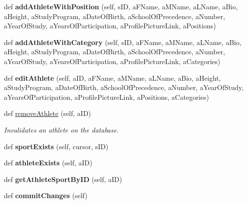 \begin{DoxyCompactItemize}
\mbox{\label{classhandler_1_1dao_1_1athlete__dao_1_1_athlete_d_a_o_a1fe64fa924a8b61d35696786f259c17f}} 
def {\bfseries add\+Athlete\+With\+Position} (self, s\+ID, a\+F\+Name, a\+M\+Name, a\+L\+Name, a\+Bio, a\+Height, a\+Study\+Program, a\+Date\+Of\+Birth, a\+School\+Of\+Precedence, a\+Number, a\+Year\+Of\+Study, a\+Years\+Of\+Participation, a\+Profile\+Picture\+Link, a\+Positions)
\item 
\mbox{\label{classhandler_1_1dao_1_1athlete__dao_1_1_athlete_d_a_o_a733537eff0206d83f15436b09704be45}} 
def {\bfseries add\+Athlete\+With\+Category} (self, s\+ID, a\+F\+Name, a\+M\+Name, a\+L\+Name, a\+Bio, a\+Height, a\+Study\+Program, a\+Date\+Of\+Birth, a\+School\+Of\+Precedence, a\+Number, a\+Year\+Of\+Study, a\+Years\+Of\+Participation, a\+Profile\+Picture\+Link, a\+Categories)
\item 
\mbox{\label{classhandler_1_1dao_1_1athlete__dao_1_1_athlete_d_a_o_a79d97bcfdc2ba5f68bfdf975f7c341b9}} 
def {\bfseries edit\+Athlete} (self, a\+ID, a\+F\+Name, a\+M\+Name, a\+L\+Name, a\+Bio, a\+Height, a\+Study\+Program, a\+Date\+Of\+Birth, a\+School\+Of\+Precedence, a\+Number, a\+Year\+Of\+Study, a\+Years\+Of\+Participation, a\+Profile\+Picture\+Link, a\+Positions, a\+Categories)
\item 
def \hyperlink{classhandler_1_1dao_1_1athlete__dao_1_1_athlete_d_a_o_a2677d09a6586e6742190c81270dc408a}{remove\+Athlete} (self, a\+ID)
\begin{DoxyCompactList}\small\item\em Invalidates an athlete on the database. \end{DoxyCompactList}\item 
\mbox{\label{classhandler_1_1dao_1_1athlete__dao_1_1_athlete_d_a_o_acf5929b8fe16451d4dad25146d93e426}} 
def {\bfseries sport\+Exists} (self, cursor, s\+ID)
\item 
\mbox{\label{classhandler_1_1dao_1_1athlete__dao_1_1_athlete_d_a_o_a03e4d89c4586e8afa2a379f9b3e99d0d}} 
def {\bfseries athlete\+Exists} (self, a\+ID)
\item 
\mbox{\label{classhandler_1_1dao_1_1athlete__dao_1_1_athlete_d_a_o_a95876679c31686ed6516687c82d3df6f}} 
def {\bfseries get\+Athlete\+Sport\+By\+ID} (self, a\+ID)
\item 
\mbox{\label{classhandler_1_1dao_1_1athlete__dao_1_1_athlete_d_a_o_ace87d62a49dc3b03b88d6ff8cf6b0210}} 
def {\bfseries commit\+Changes} (self)
\end{DoxyCompactItemize}
